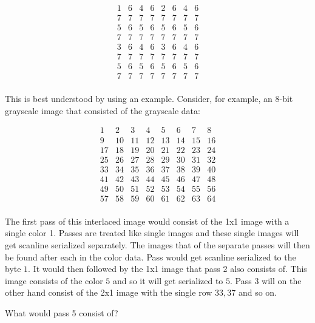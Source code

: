 \[
\begin{matrix}
  1 & 6 & 4 & 6 & 2 & 6 & 4 & 6\\
  7 & 7 & 7 & 7 & 7 & 7 & 7 & 7\\
  5 & 6 & 5 & 6 & 5 & 6 & 5 & 6\\
  7 & 7 & 7 & 7 & 7 & 7 & 7 & 7\\
  3 & 6 & 4 & 6 & 3 & 6 & 4 & 6\\
  7 & 7 & 7 & 7 & 7 & 7 & 7 & 7\\
  5 & 6 & 5 & 6 & 5 & 6 & 5 & 6\\
  7 & 7 & 7 & 7 & 7 & 7 & 7 & 7\\
\end{matrix}
\]

This is best understood by using an example. Consider, for example, an
8-bit grayscale image that consisted of the grayscale data:

\[
\begin{matrix}
  1 & 2 & 3 & 4 & 5 & 6 & 7 & 8\\
  9 & 10 & 11 & 12 & 13 & 14 & 15 & 16\\
  17 & 18 & 19 & 20 & 21 & 22 & 23 & 24\\
  25 & 26 & 27 & 28 & 29 & 30 & 31 & 32\\
  33 & 34 & 35 & 36 & 37 & 38 & 39 & 40\\
  41 & 42 & 43 & 44 & 45 & 46 & 47 & 48\\
  49 & 50 & 51 & 52 & 53 & 54 & 55 & 56\\
  57 & 58 & 59 & 60 & 61 & 62 & 63 & 64\\

\end{matrix}
\]

The first pass of this interlaced image would consist of the 1x1 image
with a single color 1. Passes are treated like single images and these
single images will get scanline serialized separately. The images that
of the separate passes will then be found after each in the color
data. Pass would get scanline serialized to the byte $1$. It would
then followed by the 1x1 image that pass 2 also consists of. This
image consists of the color $5$ and so it will get serialized to
$5$. Pass 3 will on the other hand consist of the 2x1 image with the
single row $33,37$ and so on.

\begin{Exercise}[label={ex-interlace}]

  What would pass 5 consist of?

\end{Exercise}

